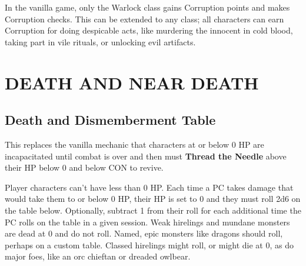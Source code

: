 \documentclass[twoside]{article}
\newcommand{\TTN}[2]{\textbf{Thread the Needle} above #1 and below #2}
\begin{document}
In the vanilla game, only the Warlock class gains Corruption points and makes Corruption checks. This can be extended to any class; all characters can earn Corruption for doing despicable acts, like murdering the innocent in cold blood, taking part in vile rituals, or unlocking evil artifacts.

\section*{DEATH AND NEAR DEATH}

\subsection*{Death and Dismemberment Table}

This replaces the vanilla mechanic that characters at or below 0 HP are incapacitated until combat is over and then must \TTN{their HP below 0}{CON} to revive.

\bigbreak

Player characters can't have less than 0 HP. Each time a PC takes damage that would take them to or below 0 HP, their HP is set to 0 and they must roll 2d6 on the table below. Optionally, subtract 1 from their roll for each additional time the PC rolls on the table in a given session. Weak hirelings and mundane monsters are dead at 0 and do not roll. Named, epic monsters like dragons should roll, perhaps on a custom table. Classed hirelings might roll, or might die at 0, as do major foes, like an orc chieftan or dreaded owlbear.

\bigbreak
\end{document}
